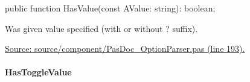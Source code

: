 \documentclass{report}
\newif\ifpdf
\begin{document}
\label{PasDoc_OptionParser.TSetOption-HasValue}
\begin{list}{}{
\setlength{\itemindent}{0cm}
\setlength{\listparindent}{0cm}
\setlength{\leftmargin}{\evensidemargin}
\addtolength{\leftmargin}{\tmplength}
\settowidth{\labelsep}{X}
\addtolength{\leftmargin}{\labelsep}
\setlength{\labelwidth}{\tmplength}
}
\item[\textbf{Declaration}\hfill]
\ifpdf
\begin{flushleft}
\fi
\begin{ttfamily}
public function HasValue(const AValue: string): boolean;\end{ttfamily}

\ifpdf
\end{flushleft}
\fi

\par
\item[\textbf{Description}]
Was given value specified (with or without ? suffix).\par
\href{https://github.com/pasdoc/pasdoc/blob/master/source/component/PasDoc_OptionParser.pas#L193}{Source: source/component/PasDoc{\_}OptionParser.pas (line 193).}

\end{list}
\paragraph*{HasToggleValue}\hspace*{\fill}
\end{document}
